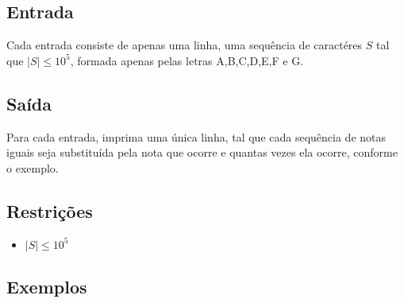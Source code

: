 \subsection*{Entrada}
\textoDiversasInstanciasEOF

Cada entrada consiste de apenas uma linha, uma sequência de caractéres $S$ tal que $|S| \leq 10^5$, formada apenas
pelas letras A,B,C,D,E,F e G.

\subsection*{Saída}
Para cada entrada, imprima uma única linha, tal que cada sequência de notas iguais seja substituída pela nota que
ocorre e quantas vezes ela ocorre, conforme o exemplo.


\subsection*{Restrições}
\begin{itemize}
  \item $|S| \leq 10^5$
\end{itemize}

\subsection*{Exemplos}

